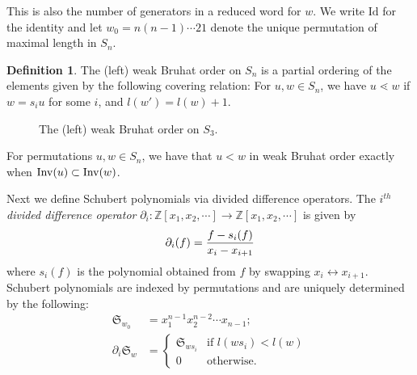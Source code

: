 \documentclass{article}
\theoremstyle{definition}
\newtheorem{definition}[theorem]{Definition} %
\begin{document}
This is also the number of generators in a reduced word for $w$. We write $\text{Id}$ for the identity and let $w_0 = n (n-1) \cdots 2 1$ denote the unique permutation of maximal length in $S_n$.


\begin{definition}
    The (left) weak Bruhat order on $S_n$ is a partial ordering of the elements given by the following covering relation: For $u, w \in S_n$, we have $u \lessdot w$ if $w = s_i u$ for some $i$, and $l(w')=l(w)+1$.
\end{definition}
\begin{figure}[h]
    \centering
    \caption{The (left) weak Bruhat order on $S_3$.}
    \label{fig:weak-bruhat}
\end{figure}




For permutations $u,w \in S_n$, we have that $u<w$ in weak Bruhat order exactly when $\mathrm{Inv}(u) \subset \mathrm{Inv}(w)$.

Next we define Schubert polynomials via divided difference operators. The $i^{th}$ \emph{divided difference operator} $\partial_i:\mathbb{Z}[x_1,x_2,\cdots]\to \mathbb{Z}[x_1,x_2,\cdots]$ is given by
\[\partial_i(f) = {f-s_i(f)\over x_i - x_{i+1}}\]
where $s_i(f)$ is the polynomial obtained from $f$ by swapping $x_i\leftrightarrow x_{i+1}$. Schubert polynomials are indexed by permutations and are uniquely determined by the following:
\begin{align*}
\mathfrak{S}_{w_0} &= x_1^{n-1}x_2^{n-2}\cdots x_{n-1};\\	
\partial_i\mathfrak{S}_{w} & =  \begin{cases}
	\mathfrak{S}_{w s_i}&\text{if } l(w s_i) < l(w)\\
	0&\text{otherwise.}
\end{cases}\end{align*}
\end{document}
